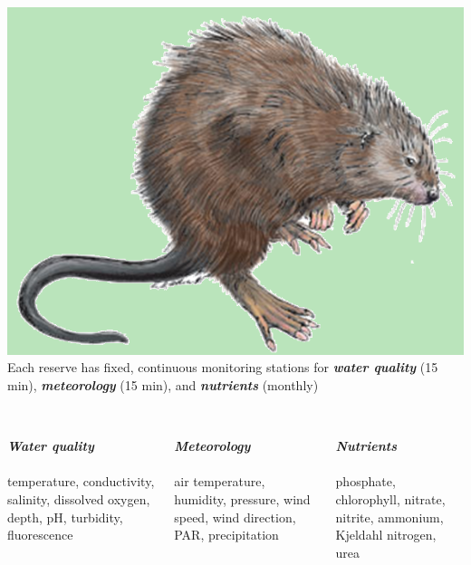 \documentclass[serif]{beamer}\usepackage[]{graphicx}\usepackage[]{color}
\newcommand{\Bigtxt}[1]{\textbf{\textit{#1}}}
\begin{document}
\begin{frame}{\includegraphics[width=0.05\paperwidth]{fig/muskrat.png}\hspace{0.07in}{\bf What is NERRS/SWMP?}}
Each reserve has fixed, continuous monitoring stations for \Bigtxt{water quality} (15 min), \Bigtxt{meteorology} (15 min), and \Bigtxt{nutrients} (monthly)\\~\\
\begin{columns}[t]
\begin{column}{0.3\textwidth}
\Bigtxt{Water quality} \\~\\
temperature, conductivity, salinity, dissolved oxygen, depth, pH, turbidity, fluorescence
\end{column}
\begin{column}{0.3\textwidth}
\Bigtxt{Meteorology} \\~\\
air temperature, humidity, pressure, wind speed, wind direction, PAR, precipitation
\end{column}
\begin{column}{0.3\textwidth}
\Bigtxt{Nutrients} \\~\\
phosphate, chlorophyll, nitrate, nitrite, ammonium, Kjeldahl nitrogen, urea
\end{column}
\end{columns}
\end{frame}
\end{document}
